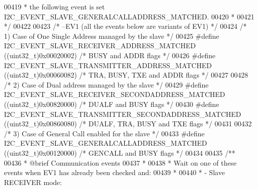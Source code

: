 \begin{DoxyCode}
00419 \textcolor{comment}{  *   the following event is set I2C\_EVENT\_SLAVE\_GENERALCALLADDRESS\_MATCHED.   }
00420 \textcolor{comment}{  * }
00421 \textcolor{comment}{  */}
00422 
00423 \textcolor{comment}{/* --EV1  (all the events below are variants of EV1) */}
00424 \textcolor{comment}{/* 1) Case of One Single Address managed by the slave */}
00425 \textcolor{preprocessor}{#}\textcolor{preprocessor}{define}  \textcolor{preprocessor}{I2C\_EVENT\_SLAVE\_RECEIVER\_ADDRESS\_MATCHED}          \textcolor{preprocessor}{(}\textcolor{preprocessor}{(}\textcolor{preprocessor}{uint32\_t}\textcolor{preprocessor}{)}0x00020002\textcolor{preprocessor}{)} \textcolor{comment}{/* BUSY and ADDR
       flags */}
00426 \textcolor{preprocessor}{#}\textcolor{preprocessor}{define}  \textcolor{preprocessor}{I2C\_EVENT\_SLAVE\_TRANSMITTER\_ADDRESS\_MATCHED}       \textcolor{preprocessor}{(}\textcolor{preprocessor}{(}\textcolor{preprocessor}{uint32\_t}\textcolor{preprocessor}{)}0x00060082\textcolor{preprocessor}{)} \textcolor{comment}{/* TRA, BUSY, TXE
       and ADDR flags */}
00427 
00428 \textcolor{comment}{/* 2) Case of Dual address managed by the slave */}
00429 \textcolor{preprocessor}{#}\textcolor{preprocessor}{define}  \textcolor{preprocessor}{I2C\_EVENT\_SLAVE\_RECEIVER\_SECONDADDRESS\_MATCHED}    \textcolor{preprocessor}{(}\textcolor{preprocessor}{(}\textcolor{preprocessor}{uint32\_t}\textcolor{preprocessor}{)}0x00820000\textcolor{preprocessor}{)}  \textcolor{comment}{/* DUALF and BUSY
       flags */}
00430 \textcolor{preprocessor}{#}\textcolor{preprocessor}{define}  \textcolor{preprocessor}{I2C\_EVENT\_SLAVE\_TRANSMITTER\_SECONDADDRESS\_MATCHED} \textcolor{preprocessor}{(}\textcolor{preprocessor}{(}\textcolor{preprocessor}{uint32\_t}\textcolor{preprocessor}{)}0x00860080\textcolor{preprocessor}{)}  \textcolor{comment}{/* DUALF, TRA, BUSY
       and TXE flags */}
00431 
00432 \textcolor{comment}{/* 3) Case of General Call enabled for the slave */}
00433 \textcolor{preprocessor}{#}\textcolor{preprocessor}{define}  \textcolor{preprocessor}{I2C\_EVENT\_SLAVE\_GENERALCALLADDRESS\_MATCHED}        \textcolor{preprocessor}{(}\textcolor{preprocessor}{(}\textcolor{preprocessor}{uint32\_t}\textcolor{preprocessor}{)}0x00120000\textcolor{preprocessor}{)}  \textcolor{comment}{/* GENCALL and BUSY
       flags */}
00434 
00435 \textcolor{comment}{/** }
00436 \textcolor{comment}{  * @brief  Communication events}
00437 \textcolor{comment}{  * }
00438 \textcolor{comment}{  * Wait on one of these events when EV1 has already been checked and: }
00439 \textcolor{comment}{  * }
00440 \textcolor{comment}{  * - Slave RECEIVER mode:}

\end{DoxyCode}
